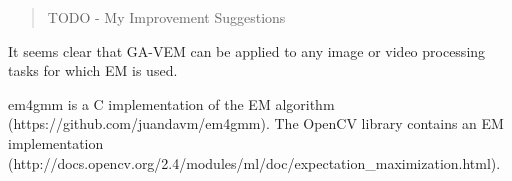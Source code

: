 \documentclass[11pt]{article}
\begin{document}
\begin{quote}TODO - My Improvement Suggestions\end{quote}

It seems clear that GA-VEM can be applied to any image or video processing tasks
for which EM is used.

em4gmm is a C implementation of the EM algorithm \\
(https://github.com/juandavm/em4gmm). The OpenCV library contains an EM
implementation \\
(http://docs.opencv.org/2.4/modules/ml/doc/expectation\_maximization.html).



\end{document}
